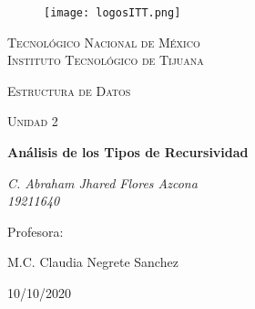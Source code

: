 \documentclass[letterpaper, 12pt]{article}
\begin{document}
    
    \begin{titlepage}
        \begin{figure}[ht]
            \centering
            \texttt{[image: logosITT.png]}
        \end{figure}
        \centering
        {\scshape\LARGE Tecnológico Nacional de México\\Instituto Tecnológico de Tijuana\par}
        \vspace{1cm}
        {\scshape\Large Estructura de Datos\par}
        \vspace{1cm}
        {\scshape\Large Unidad 2\par}
        \vspace{1.5cm}
        {\huge\bfseries Análisis de los Tipos de Recursividad\par}
        \vspace{2cm}
        {\Large\itshape C. Abraham Jhared Flores Azcona\\19211640\par}
        \vfill
        Profesora: \par
        M.C. Claudia Negrete Sanchez
    
        \vfill

        {\large 10/10/2020}
    \end{titlepage}

    \newpage
        \thispagestyle{empty}
        \tableofcontents
\end{document}
